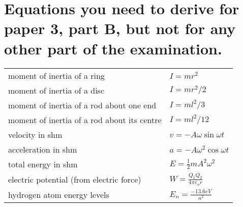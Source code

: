 \documentclass[main.tex]{subfiles}
\begin{document}
\section{Equations you need to derive for paper 3, part B, but not for any other part of the examination.}

\renewcommand*{\arraystretch}{2}
\begin{longtable}{ll}

moment of inertia of a ring & $I = mr^2$\\

moment of inertia of a disc & $I = mr^{2}/2$\\

moment of inertia of a rod about one end & $I = ml^2/3$\\

moment of inertia of a rod about its centre & $I = ml^{2}/12$\\

velocity in shm & $v = -A\omega \sin{\omega t}$\\

acceleration in shm & $a = -A\omega^{2}\cos{\omega t}$\\

total energy in shm & $E = \frac{1}{2}mA^2\omega^2$\\

electric potential (from electric force) &
\(W = \frac{Q_{1}Q_{2}}{4\pi\varepsilon_{o}r}\)\\

hydrogen atom energy levels &\(E_{n} = \frac{- 13.6eV}{n^{2}}\)\\
\end{longtable}
\end{document}
